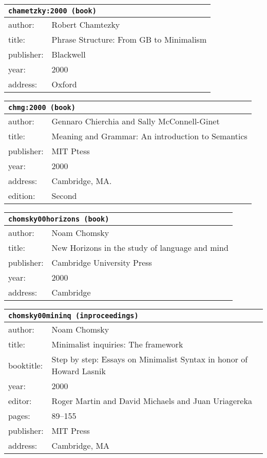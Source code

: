 \documentclass{article}
\begin{document}
\bigskip

\begin{tabular}{p{}p{}}
\multicolumn{2}{l}{\texttt{chametzky:2000 (book)}}\\
\hline
author: & Robert Chamtezky\\
title: & Phrase Structure: From \textsc{GB} to \textsc{M}inimalism\\
publisher: & Blackwell\\
year: & 2000\\
address: & Oxford\\
\end{tabular}

\bigskip

\begin{tabular}{p{}p{}}
\multicolumn{2}{l}{\texttt{chmg:2000 (book)}}\\
\hline
author: & Gennaro Chierchia and Sally McConnell-Ginet\\
title: & Meaning and Grammar: An introduction to Semantics\\
publisher: & MIT Ptess\\
year: & 2000\\
address: & Cambridge, MA.\\
edition: & Second\\
\end{tabular}

\bigskip

\begin{tabular}{p{}p{}}
\multicolumn{2}{l}{\texttt{chomsky00horizons (book)}}\\
\hline
author: & Noam Chomsky\\
title: & New Horizons in the study of language and mind\\
publisher: & Cambridge University Press\\
year: & 2000\\
address: & Cambridge\\
\end{tabular}

\bigskip

\begin{tabular}{p{}p{}}
\multicolumn{2}{l}{\texttt{chomsky00mininq (inproceedings)}}\\
\hline
author: & Noam Chomsky\\
title: & Minimalist inquiries: The framework\\
booktitle: & Step by step: Essays on Minimalist Syntax in honor of Howard Lasnik\\
year: & 2000\\
editor: & Roger Martin and David Michaels and Juan Uriagereka\\
pages: & 89--155\\
publisher: & MIT Press\\
address: & Cambridge, MA\\
\end{tabular}
\end{document}
